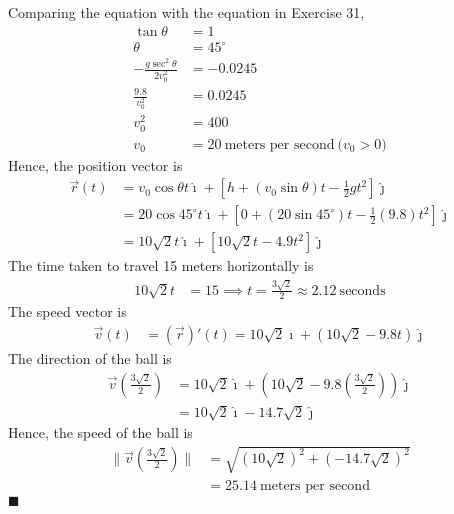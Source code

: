 \begin{enumerate}
          \sol{}  Comparing the equation with the equation in Exercise 31,
          \begin{align*}
              \tan \theta                       & = 1                                                \\
              \theta                            & = 45^{\circ}                                       \\
              -\frac{g \sec ^2 \theta}{2 v_0^2} & = -0.0245                                          \\
              \frac{9.8}{v_0^2}                 & = 0.0245                                           \\
              v_0^2                             & = 400                                              \\
              v_0                               & = 20\ \text{meters per second}\ \text{($v_0 > 0$)}
          \end{align*}
          Hence, the position vector is
          \begin{align*}
              \vec{r}(t) & = v_0\cos\theta t\hat{\imath} + \left[h + (v_0\sin\theta) t - \frac{1}{2}gt^2\right]\hat{\jmath}               \\
                         & = 20\cos{45^{\circ}} t\hat{\imath} + \left[0 + (20\sin{45^{\circ}}) t - \frac{1}{2}(9.8)t^2\right]\hat{\jmath} \\
                         & = 10\sqrt{2} t\hat{\imath} + \left[10\sqrt{2} t - 4.9t^2\right]\hat{\jmath}
          \end{align*}
          The time taken to travel 15 meters horizontally is
          \begin{align*}
              10\sqrt{2} t & = 15 \implies t = \frac{3\sqrt{2}}{2} \approx 2.12\ \text{seconds}
          \end{align*}
          The speed vector is
          \begin{align*}
              \vec{v}(t) & = (\vec{r})'(t) = 10\sqrt{2}\hat{\imath} + (10\sqrt{2} - 9.8t)\hat{\jmath}
          \end{align*}
          The direction of the ball is
          \begin{align*}
              \vec{v}\left(\frac{3\sqrt{2}}{2}\right) & = 10\sqrt{2}\hat{\imath} + (10\sqrt{2} - 9.8\left(\frac{3\sqrt{2}}{2}\right))\hat{\jmath} \\
                                                      & = 10\sqrt{2}\hat{\imath} - 14.7\sqrt{2}\hat{\jmath}
          \end{align*}
          Hence, the speed of the ball is
          \begin{align*}
              \lVert\vec{v}\left(\frac{3\sqrt{2}}{2}\right)\rVert & = \sqrt{(10\sqrt{2})^2 + (-14.7\sqrt{2})^2} \\
                                                                  & = 25.14\ \text{meters per second}
          \end{align*} \hfill$\blacksquare$
\end{enumerate}

\newpage